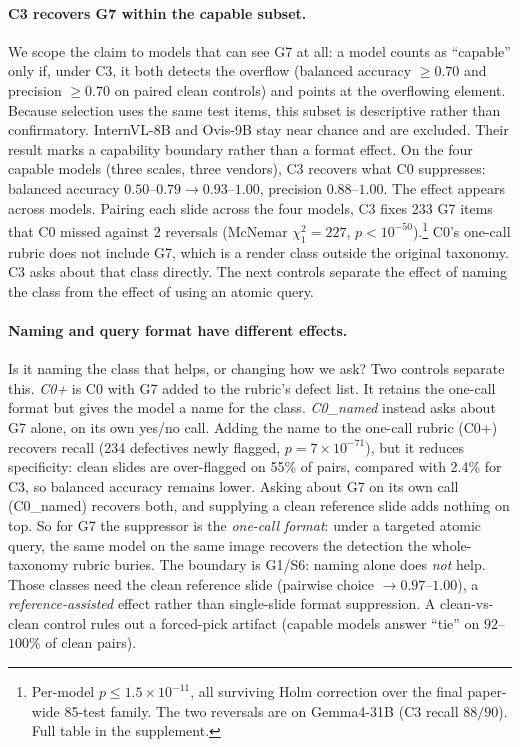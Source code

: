 \documentclass[letterpaper]{article}            %
\newcommand{\g}[1]{\textsf{#1}}        %
\begin{document}
\paragraph{C3 recovers \g{G7} within the capable subset.}
We scope the claim to models that can see \g{G7} at all: a model counts as ``capable'' only if, under C3, it
both detects the overflow (balanced accuracy $\ge0.70$ and precision $\ge0.70$ on paired clean controls) and
points at the overflowing element. Because selection uses the same test items, this subset is descriptive rather
than confirmatory. InternVL-8B and Ovis-9B stay near chance and are excluded. Their result marks a capability boundary rather
than a format effect. On the four capable models (three scales, three vendors), C3
recovers what C0 suppresses: balanced accuracy $0.50$--$0.79\!\to\!0.93$--$1.00$, precision $0.88$--$1.00$.
The effect appears across models. Pairing each slide across the four models, C3 fixes 233 \g{G7} items that C0
missed against 2 reversals (McNemar $\chi^2_1{=}227$, $p<10^{-50}$).\footnote{Per-model $p\le1.5\!\times\!10^{-11}$,
all surviving Holm correction over the final paper-wide 85-test family. The two reversals are on Gemma4-31B
(C3 recall $88/90$). Full table in the supplement.} C0's one-call rubric does not include \g{G7}, which is a render class outside the original taxonomy. C3 asks
about that class directly. The next controls separate the effect of naming the class from the effect of using an
atomic query.

\paragraph{Naming and query format have different effects.}
Is it naming the class that helps, or changing how we ask? Two controls separate this. \emph{C0+} is C0 with
\g{G7} added to the rubric's defect list. It retains the one-call format but gives the model a name for the
class. \emph{C0\_named} instead asks about \g{G7} alone, on its own yes/no call. Adding the name to the one-call rubric (C0+) recovers recall (234
defectives newly flagged, $p{=}7\!\times\!10^{-71}$), but it reduces specificity: clean slides are over-flagged
on 55\% of pairs, compared with 2.4\% for C3, so balanced accuracy remains lower. Asking about \g{G7} on its own call (C0\_named) recovers
both, and supplying a clean reference slide adds nothing on top. So for \g{G7} the suppressor is the
\emph{one-call format}: under a targeted atomic query, the same model on the same image recovers the detection
the whole-taxonomy rubric buries. The boundary is \g{G1}/\g{S6}: naming alone does \emph{not}
help. Those classes need the clean reference slide (pairwise choice $\to0.97$--$1.00$), a
\emph{reference-assisted} effect rather than single-slide format suppression. A clean-vs-clean control rules out a
forced-pick artifact (capable models answer ``tie'' on $92$--$100\%$ of clean pairs).
\end{document}
